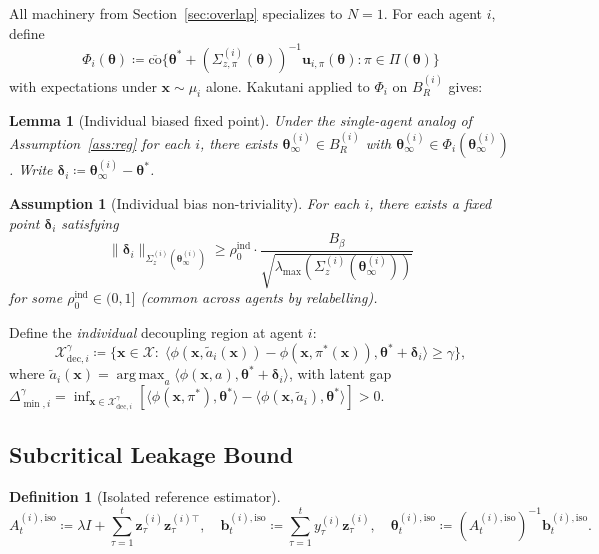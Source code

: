 \documentclass[11pt]{article}
\newtheorem{lemma}[theorem]{Lemma}
\newtheorem{definition}[theorem]{Definition}
\newtheorem{assumption}[theorem]{Assumption}
\DeclareMathOperator*{\argmax}{arg\,max}
\begin{document}
All machinery from Section~\ref{sec:overlap} specializes to $N=1$.
For each agent $i$, define
\[
\Phi_i(\bm{\theta})\coloneqq
\overline{\mathrm{co}}\bigl\{
\bm{\theta}^{\!*}+(\Sigma_{z,\pi}^{(i)}(\bm{\theta}))^{-1}
\bm{u}_{i,\pi}(\bm{\theta}):\pi\in\Pi(\bm{\theta})\bigr\}
\]
with expectations under $\bm{x}\sim\mu_i$ alone.
Kakutani applied to $\Phi_i$ on $B_R^{(i)}$ gives:

\begin{lemma}[Individual biased fixed point]\label{lem:fp_ind}
Under the single-agent analog of Assumption~\ref{ass:reg} for each $i$,
there exists $\bm{\theta}_\infty^{(i)}\in B_R^{(i)}$ with
$\bm{\theta}_\infty^{(i)}\in\Phi_i(\bm{\theta}_\infty^{(i)})$.
Write $\bm{\delta}_i\coloneqq\bm{\theta}_\infty^{(i)}-\bm{\theta}^{\!*}$.
\end{lemma}

\begin{assumption}[Individual bias non-triviality]\label{ass:bias_ind}
For each $i$, there exists a fixed point $\bm{\delta}_i$ satisfying
\[
\|\bm{\delta}_i\|_{\Sigma_z^{(i)}(\bm{\theta}_\infty^{(i)})}
\geq\rho_0^{\mathrm{ind}}\cdot
\frac{B_\beta}{\sqrt{\lambda_{\max}(\Sigma_z^{(i)}(\bm{\theta}_\infty^{(i)}))}}
\]
for some $\rho_0^{\mathrm{ind}}\in(0,1]$ (common across agents by
relabelling).
\end{assumption}

Define the \emph{individual} decoupling region at agent $i$:
\[
\mathcal{X}_{\mathrm{dec},i}^\gamma\coloneqq
\bigl\{\bm{x}\in\mathcal{X}:\;
\langle\phi(\bm{x},\tilde{a}_i(\bm{x}))-\phi(\bm{x},\pi^{\!*}(\bm{x})),
\bm{\theta}^{\!*}+\bm{\delta}_i\rangle\geq\gamma\bigr\},
\]
where $\tilde{a}_i(\bm{x})=\argmax_a\langle\phi(\bm{x},a),\bm{\theta}^{\!*}+\bm{\delta}_i\rangle$,
with latent gap
$\Delta_{\min,i}^\gamma=\inf_{\bm{x}\in\mathcal{X}_{\mathrm{dec},i}^\gamma}
[\langle\phi(\bm{x},\pi^{\!*}),\bm{\theta}^{\!*}\rangle
-\langle\phi(\bm{x},\tilde{a}_i),\bm{\theta}^{\!*}\rangle]>0$.

\subsection{Subcritical Leakage Bound}

\begin{definition}[Isolated reference estimator]
\[
A_t^{(i),\mathrm{iso}}\coloneqq\lambda I+\sum_{\tau=1}^t
\bm{z}_\tau^{(i)}\bm{z}_\tau^{(i)\top},\quad
\bm{b}_t^{(i),\mathrm{iso}}\coloneqq\sum_{\tau=1}^t
y_\tau^{(i)}\bm{z}_\tau^{(i)},\quad
\bm{\theta}_t^{(i),\mathrm{iso}}\coloneqq(A_t^{(i),\mathrm{iso}})^{-1}
\bm{b}_t^{(i),\mathrm{iso}}.
\]
\end{definition}
\end{document}
